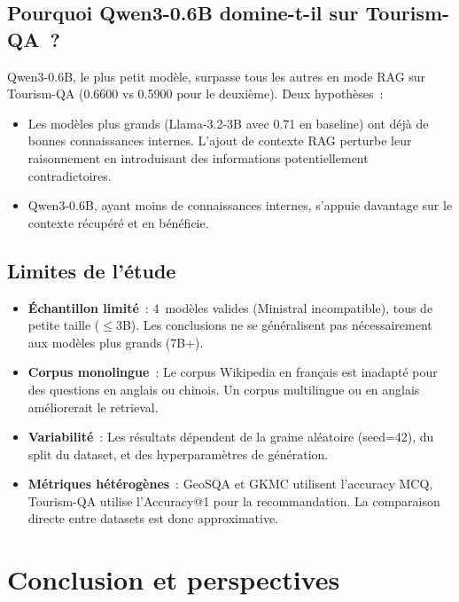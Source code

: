\documentclass[12pt,a4paper]{article}
\begin{document}
\subsection{Pourquoi Qwen3-0.6B domine-t-il sur Tourism-QA~?}

Qwen3-0.6B, le plus petit mod\`ele, surpasse tous les autres en mode RAG sur Tourism-QA (0.6600 vs 0.5900 pour le deuxi\`eme). Deux hypoth\`eses~:

\begin{itemize}[leftmargin=*]
    \item Les mod\`eles plus grands (Llama-3.2-3B avec 0.71 en baseline) ont d\'ej\`a de bonnes connaissances internes. L'ajout de contexte RAG perturbe leur raisonnement en introduisant des informations potentiellement contradictoires.
    \item Qwen3-0.6B, ayant moins de connaissances internes, s'appuie davantage sur le contexte r\'ecup\'er\'e et en b\'en\'eficie.
\end{itemize}

\subsection{Limites de l'\'etude}

\begin{itemize}[leftmargin=*]
    \item \textbf{\'Echantillon limit\'e}~: 4~mod\`eles valides (Ministral incompatible), tous de petite taille ($\leq$3B). Les conclusions ne se g\'en\'eralisent pas n\'ecessairement aux mod\`eles plus grands (7B+).
    \item \textbf{Corpus monolingue}~: Le corpus Wikipedia en fran\c{c}ais est inadapt\'e pour des questions en anglais ou chinois. Un corpus multilingue ou en anglais am\'eliorerait le retrieval.
    \item \textbf{Variabilit\'e}~: Les r\'esultats d\'ependent de la graine al\'eatoire (seed=42), du split du dataset, et des hyperparam\`etres de g\'en\'eration.
    \item \textbf{M\'etriques h\'et\'erog\`enes}~: GeoSQA et GKMC utilisent l'accuracy MCQ, Tourism-QA utilise l'Accuracy@1 pour la recommandation. La comparaison directe entre datasets est donc approximative.
\end{itemize}


\section{Conclusion et perspectives}
\end{document}
